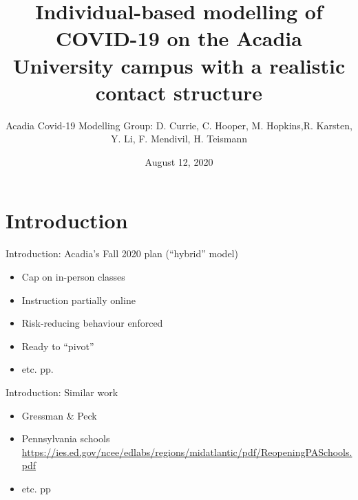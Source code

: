 \documentclass{beamer}
\title{Individual-based modelling of COVID-19 on the Acadia University campus with a realistic contact structure}
\date{August 12, 2020}
\author{\footnotesize Acadia Covid-19 Modelling Group: D. Currie, C. Hooper, M. Hopkins,\linebreak  R. Karsten, Y. Li, F. Mendivil,  H. Teismann}
\institute{AARMS COVID-19 Seminar}
\begin{document}
  \maketitle
  \section*{Introduction}
  \begin{frame}{Introduction: Acadia's Fall 2020 plan (``hybrid'' model) }
 \begin{itemize}
   \item Cap on in-person classes \pause 
   \item Instruction partially online \pause
   \item Risk-reducing behaviour enforced\pause 
   \item Ready to ``pivot'' \pause 
   \item etc. pp.   
\end{itemize}
\end{frame}
 \begin{frame}{Introduction: Similar work}
 \begin{itemize}
 \item Gressman \& Peck \cite{gressman2020simulating}\pause 
 \item Pennsylvania schools {\tiny \href{https://ies.ed.gov/ncee/edlabs/regions/midatlantic/pdf/ReopeningPASchools.pdf}{https://ies.ed.gov/ncee/edlabs/regions/midatlantic/pdf/ReopeningPASchools.pdf} }\pause 
 \item etc. pp 
 \end{itemize}
 \end{frame}
\end{document}
